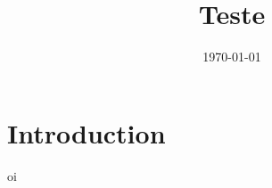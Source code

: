 \documentclass{article}
\title{Teste}
\author{}
\date{\today}
\begin{document}
\maketitle

\section{Introduction}
oi
\end{document}
